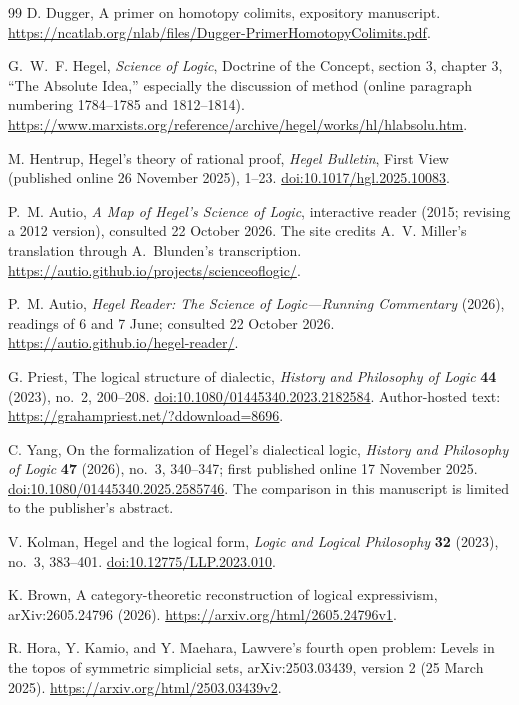 \begin{thebibliography}{99}
D. Dugger, A primer on homotopy colimits, expository manuscript.
\url{https://ncatlab.org/nlab/files/Dugger-PrimerHomotopyColimits.pdf}.

G.~W.~F. Hegel, \emph{Science of Logic}, Doctrine of the Concept,
section 3, chapter 3, ``The Absolute Idea,'' especially the discussion
of method (online paragraph numbering 1784--1785 and 1812--1814).
\url{https://www.marxists.org/reference/archive/hegel/works/hl/hlabsolu.htm}.

M. Hentrup, Hegel's theory of rational proof, \emph{Hegel Bulletin},
First View (published online 26 November 2025), 1--23.
\href{https://doi.org/10.1017/hgl.2025.10083}{doi:10.1017/hgl.2025.10083}.

P.~M. Autio, \emph{A Map of Hegel's Science of Logic}, interactive
reader (2015; revising a 2012 version), consulted 22 October 2026.
The site credits A.~V. Miller's translation through A.~Blunden's
transcription. \url{https://autio.github.io/projects/scienceoflogic/}.

P.~M. Autio, \emph{Hegel Reader: The Science of Logic---Running
Commentary} (2026), readings of 6 and 7 June; consulted 22 October 2026.
\url{https://autio.github.io/hegel-reader/}.

G. Priest, The logical structure of dialectic, \emph{History and
Philosophy of Logic} \textbf{44} (2023), no.~2, 200--208.
\href{https://doi.org/10.1080/01445340.2023.2182584}{doi:10.1080/01445340.2023.2182584}.
Author-hosted text: \url{https://grahampriest.net/?ddownload=8696}.

C. Yang, On the formalization of Hegel's dialectical logic,
\emph{History and Philosophy of Logic} \textbf{47} (2026), no.~3,
340--347; first published online 17 November 2025.
\href{https://doi.org/10.1080/01445340.2025.2585746}{doi:10.1080/01445340.2025.2585746}.
The comparison in this manuscript is limited to the publisher's abstract.

V. Kolman, Hegel and the logical form, \emph{Logic and Logical
Philosophy} \textbf{32} (2023), no.~3, 383--401.
\href{https://doi.org/10.12775/LLP.2023.010}{doi:10.12775/LLP.2023.010}.

K. Brown, A category-theoretic reconstruction of logical expressivism,
arXiv:2605.24796 (2026).
\url{https://arxiv.org/html/2605.24796v1}.

R. Hora, Y. Kamio, and Y. Maehara, Lawvere's fourth open problem:
Levels in the topos of symmetric simplicial sets, arXiv:2503.03439,
version 2 (25 March 2025).
\url{https://arxiv.org/html/2503.03439v2}.


\end{thebibliography}
